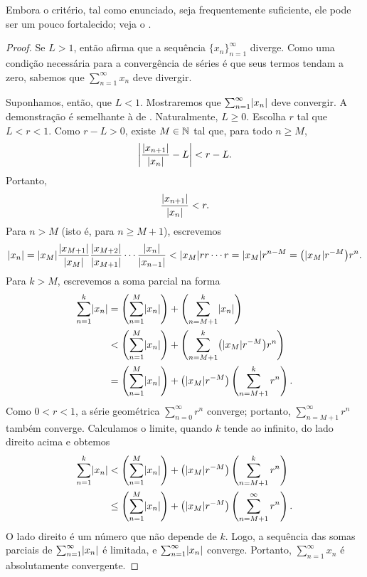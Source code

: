 Embora o critério, tal como enunciado, seja frequentemente suficiente, ele pode ser um pouco
fortalecido; veja o .

\begin{proof}
Se $L > 1$, então
 afirma que a sequência $\{ x_n \}_{n=1}^\infty$
diverge. Como uma condição necessária para a convergência de séries
é que seus termos tendam a zero, sabemos que $\sum_{n=1}^\infty x_n$ deve divergir.

Suponhamos, então, que $L < 1$.
Mostraremos que $\sum_{n=1}^\infty \lvert {x_n} \rvert$ deve convergir.
A demonstração é semelhante à de . Naturalmente, $L \geq
0$.
Escolha
$r$ tal que $L < r < 1$. Como $r-L > 0$, existe $M \in {\mathbb{N}}$ tal que, para
todo $n \geq M$,
\begin{equation*}
\left\lvert {\frac{\lvert {x_{n+1}} \rvert}{\lvert {x_n} \rvert} - L} \right\rvert < r-L .
\end{equation*}
Portanto,
\begin{equation*}
\frac{\lvert {x_{n+1}} \rvert}{\lvert {x_n} \rvert} < r .
\end{equation*}
Para $n > M$ (isto é, para $n \geq M+1$),
escrevemos
\begin{equation*}
\lvert {x_n} \rvert =
\lvert {x_M} \rvert
\frac{\lvert {x_{M+1}} \rvert}{\lvert {x_{M}} \rvert}
\frac{\lvert {x_{M+2}} \rvert}{\lvert {x_{M+1}} \rvert}
\cdots
\frac{\lvert {x_{n}} \rvert}{\lvert {x_{n-1}} \rvert}
<
\lvert {x_M} \rvert
r r \cdots r = \lvert {x_M} \rvert r^{n-M} =
\bigl(\lvert {x_M} \rvert r^{-M}\bigr) r^n .
\end{equation*}
Para $k > M$, escrevemos a soma parcial na forma
\begin{equation*}
\begin{split}
\sum_{n=1}^k \lvert {x_n} \rvert
& =
\left(\sum_{n=1}^{M} \lvert {x_n} \rvert \right)
+
\left(\sum_{n=M+1}^{k} \lvert {x_n} \rvert \right)
\\
& <
\left(\sum_{n=1}^{M} \lvert {x_n} \rvert \right)
+
\left(\sum_{n=M+1}^{k} 
\bigl(\lvert {x_M} \rvert r^{-M}\bigr) r^n
\right)
\\
& =
\left(\sum_{n=1}^{M} \lvert {x_n} \rvert \right)
+
\bigl(\lvert {x_M} \rvert r^{-M}\bigr)
\left( \sum_{n=M+1}^{k} r^n \right) .
\end{split}
\end{equation*}
Como $0 < r < 1$, a série geométrica
$\sum_{n=0}^{\infty} r^n$ converge; portanto,
$\sum_{n=M+1}^{\infty} r^n$ também converge. Calculamos o
limite, quando $k$ tende ao infinito, do lado direito acima e obtemos
\begin{equation*}
\begin{split}
\sum_{n=1}^k \lvert {x_n} \rvert
& <
\left(\sum_{n=1}^{M} \lvert {x_n} \rvert \right)
+
\bigl(\lvert {x_M} \rvert r^{-M}\bigr)
\left( \sum_{n=M+1}^{k} r^n \right) 
\\
& \leq
\left(\sum_{n=1}^{M} \lvert {x_n} \rvert \right)
+
\bigl(\lvert {x_M} \rvert r^{-M}\bigr)
\left( \sum_{n=M+1}^{\infty} r^n \right) .
\end{split}
\end{equation*}
O lado direito é um número que não depende de $k$.
Logo, a sequência das somas parciais de $\sum_{n=1}^\infty \lvert {x_n} \rvert$ é limitada,
e $\sum_{n=1}^\infty \lvert {x_n} \rvert$ converge. Portanto, $\sum_{n=1}^\infty x_n$ é
absolutamente convergente.
\end{proof}


